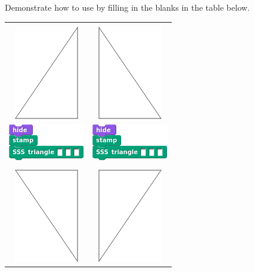 \documentclass[noauthor,nooutcomes,12pt,hints]{ximera}
\begin{document}
\begin{question}%
  Demonstrate how to use  by filling in the
  blanks in the table below.
  \begin{center}
    \begin{tabular}{|c||c|}\hline
      &  \\
      \includegraphics{EgStageII.png} & \includegraphics{EgStageI.png} \\
      \includegraphics{SSSstampBlank.png} & \includegraphics{SSSstampBlank.png} \\
      \hline\hline
      &  \\
      \includegraphics{EgStageIII.png} & \includegraphics{EgStageIV.png} \\

\end{tabular}
\end{center}
\end{question}
\end{document}
